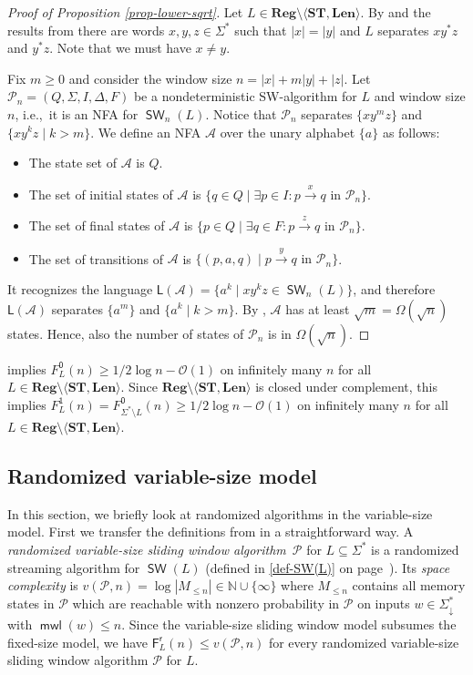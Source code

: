 \documentclass{article}\usepackage[a4paper,margin=20mm]{geometry}
\newcommand{\N}{\mathbb{N}}
\newcommand{\A}{\mathcal{A}}
\renewcommand{\O}{\mathcal{O}}
\renewcommand{\P}{\mathcal{P}}
\newcommand{\F}{\mathsf{F}}
\renewcommand{\L}{\mathsf{L}}
\renewcommand{\r}{\mathsf{r}}
\DeclareMathOperator{\mwl}{\mathsf{mwl}}
\DeclareMathOperator{\SW}{\mathsf{SW}}
\newcommand{\Reg}{\mathbf{Reg}}
\newcommand{\Len}{\mathbf{Len}}
\newcommand{\ST}{\mathbf{ST}}
\renewcommand{\geq}{\geqslant}
\renewcommand{\leq}{\leqslant}
\renewcommand{\le}{\leq}
\begin{document}
\begin{proof}[Proof of Proposition \ref{prop-lower-sqrt}]
Let $L \in \Reg \setminus \langle \ST, \Len \rangle$.
By  and the results from 
there are words $x,y,z \in \Sigma^*$ such that $|x|=|y|$ and
$L$ separates $x y^* z$ and $y^* z$.
Note that we must have $x \neq y$.

Fix $m \geq 0$ and consider the window size $n  =  |x| + m|y| + |z|$.
Let $\P_n = (Q,\Sigma,I,\Delta,F)$ be a nondeterministic SW-algorithm for $L$ and window size $n$,
i.e.,~it is an NFA for $\SW_n(L)$.
Notice that $\P_n$ separates $\{x y^m z\}$ and $\{ x y^k z \mid k > m\}$.
We define an NFA $\A$ over the unary alphabet $\{a\}$ as follows:
\begin{itemize}
\item The state set of $\A$ is $Q$.
\item The set of initial states of $\A$ is $\{ q \in Q \mid \exists p \in I \colon p \xrightarrow{ x } q \text{ in } \P_n \}$.
\item The set of final states of $\A$  is $\{ p \in Q \mid \exists q \in F \colon p \xrightarrow{ z } q \text{ in } \P_n \}$.
\item The set of transitions of $\A$ is $\{ (p,a,q) \mid p \xrightarrow{y} q \text{ in } \P_n \}$.
\end{itemize}
It recognizes the language $\L(\A) = \{ a^k \mid x y^k z \in \SW_n(L) \}$,
and therefore $\L(\A)$ separates $\{a^m\}$ and $\{ a^k \mid k > m \}$.
By , $\A$ has at least $\sqrt{m} = \Omega(\sqrt{n})$ states.
Hence, also the number of states of $\P_n$ is in $\Omega(\sqrt{n})$.
\end{proof}

  implies $F^\mathsf{0}_L(n) \geq 1/2 \log n - \O(1)$ on infinitely many $n$ 
 for all $L \in \Reg \setminus \langle \ST, \Len \rangle$.
Since $\Reg \setminus \langle \ST, \Len \rangle$ is closed under complement,
this implies $F^\mathsf{1}_L(n)=F^\mathsf{0}_{\Sigma^* \setminus L}(n) \geq 1/2 \log n - \O(1)$ 
on infinitely many $n$ for all $L \in \Reg \setminus \langle \ST, \Len \rangle$.

\subsection{Randomized variable-size model} \label{sec-randomized-variable}

In this section, we briefly look at randomized algorithms in the variable-size model.
First we transfer the definitions from  in a straightforward way.
A {\em randomized variable-size sliding window algorithm}~$\P$ for $L \subseteq \Sigma^*$
is a randomized streaming algorithm for $\SW(L)$ (defined in \eqref{def-SW(L)} on page~\pageref{def-SW(L)}).
Its {\em space complexity} is $v(\P,n) = \log |M_{\le n}| \in \N \cup \{\infty\}$
where $M_{\le n}$ contains all memory states in $\P$ which are reachable with nonzero probability in $\P$
on inputs $w \in \Sigma_\downarrow^*$ with $\mwl(w) \le n$.
Since the variable-size sliding window model subsumes the fixed-size model,
we have $\F^\r_L(n) \le v(\P,n)$ for every randomized variable-size
sliding window algorithm $\P$ for $L$.
\end{document}
